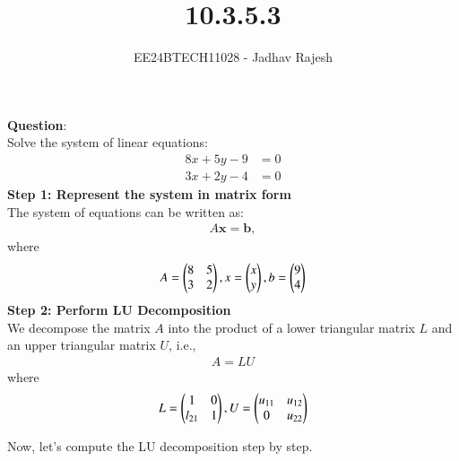 \documentclass[journal]{IEEEtran}
\begin{document}

\vspace{3cm}

\title{10.3.5.3}
\author{EE24BTECH11028 - Jadhav Rajesh}
\maketitle
{\let\newpage\relax\maketitle}

\renewcommand{\thefigure}{\theenumi}
\renewcommand{\thetable}{\theenumi}
\setlength{\intextsep}{10pt} %


\renewcommand{\thetable}{\theenumi}
\textbf{Question}:\\
Solve the system of linear equations:
\begin{align}
    8x + 5y - 9 &= 0 \\
    3x + 2y - 4  &= 0
\end{align}
\textbf{Step 1: Represent the system in matrix form} \\ 
The system of equations can be written as:  
\begin{align}  
A \mathbf{x} = \mathbf{b},  
\end{align}  
where  
\begin{align}
    A=\begin{pmatrix}8 & 5 \\ 
             3 & 2\end{pmatrix} ,
    x=\begin{pmatrix}x\\y\end{pmatrix} ,
    b=\begin{pmatrix}9 \\ 4\end{pmatrix}
\end{align}
\textbf{Step 2: Perform LU Decomposition} \\ 
We decompose the matrix $A$ into the product of a lower triangular matrix $L$ and an upper triangular matrix $U$, i.e.,  
\begin{align}  
A = LU
\end{align}  
where  
\begin{align}  
L=\begin{pmatrix}1 & 0\\l_{21} & 1\end{pmatrix},
U=\begin{pmatrix}u_{11} & u_{12}\\0 & u_{22}\end{pmatrix}
\end{align}

Now, let's compute the LU decomposition step by step.  
\end{document}
